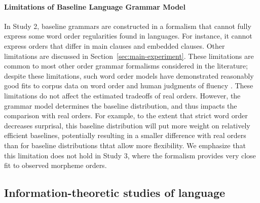 \paragraph{Limitations of Baseline Language Grammar Model}
In Study 2, baseline grammars are constructed in a formalism that cannot fully express some word order regularities found in languages.
For instance, it cannot express orders that differ in main clauses and embedded clauses. Other limitations are discussed in Section~\ref{sec:main-experiment}.
These limitations are common to most other order grammar formalisms considered in the literature; despite these limitations, such word order models have demonstrated reasonably good fits to corpus data on word order and human judgments of fluency \citep{futrell2015experiments,wang2016galactic}.
These limitations do not affect the estimated tradeoffs of real orders.
However, the grammar model determines the baseline distribution, and thus impacts the comparison with real orders.
For example, to the extent that strict word order decreases surprisal, this baseline distribution will put more weight on relatively efficient baselines, potentially resulting in a smaller difference with real orders than for baseline distributions thtat allow more flexibility.
We emphasize that this limitation does not hold in Study 3, where the formalism provides very close fit to observed morpheme orders.




\subsection{Information-theoretic studies of language}\label{sec:disc:infotheory}

